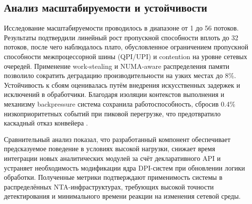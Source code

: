\subsection{Анализ масштабируемости и устойчивости}
Исследование масштабируемости проводилось в диапазоне от 1 до 56 потоков. Результаты подтвердили линейный рост пропускной способности вплоть до 32 потоков, после чего наблюдалось плато, обусловленное ограничением пропускной способности межпроцессорной шины (QPI/UPI) и contention на уровне сетевых очередей. Применение work-stealing и NUMA-aware распределения памяти позволило сократить деградацию производительности на узких местах до 8\%. Устойчивость к сбоям оценивалась путём внедрения искусственных задержек и исключений в обработчики. Благодаря изоляции контекстов выполнения и механизму backpressure система сохранила работоспособность, сбросив 0.4\% низкоприоритетных событий при пиковой перегрузке, что предотвратило каскадный отказ конвейера \cite{dag2022design}.

Сравнительный анализ показал, что разработанный компонент обеспечивает предсказуемое поведение в условиях высокой нагрузки, снижает время интеграции новых аналитических модулей за счёт декларативного API и устраняет необходимость модификации ядра DPI-систем при обновлении логики обработки. Полученные метрики подтверждают применимость системы в распределённых NTA-инфраструктурах, требующих высокой точности детектирования и минимального времени реакции на изменения сетевой среды.

\newpage